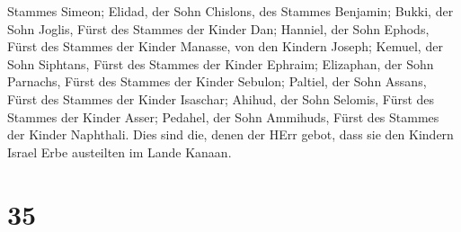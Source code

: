 Stammes Simeon;  Elidad, der Sohn Chislons, des Stammes
Benjamin;  Bukki, der Sohn Joglis, Fürst des Stammes der
Kinder Dan;  Hanniel, der Sohn Ephods, Fürst des Stammes
der Kinder Manasse, von den Kindern Joseph;  Kemuel, der
Sohn Siphtans, Fürst des Stammes der Kinder Ephraim; 
Elizaphan, der Sohn Parnachs, Fürst des Stammes der Kinder Sebulon;
 Paltiel, der Sohn Assans, Fürst des Stammes der Kinder
Isaschar;  Ahihud, der Sohn Selomis, Fürst des Stammes
der Kinder Asser;  Pedahel, der Sohn Ammihuds, Fürst des
Stammes der Kinder Naphthali.  Dies sind die, denen der
HErr gebot, dass sie den Kindern Israel Erbe austeilten im Lande Kanaan.

\hypertarget{section-34}{%
\section{35}\label{section-34}}

